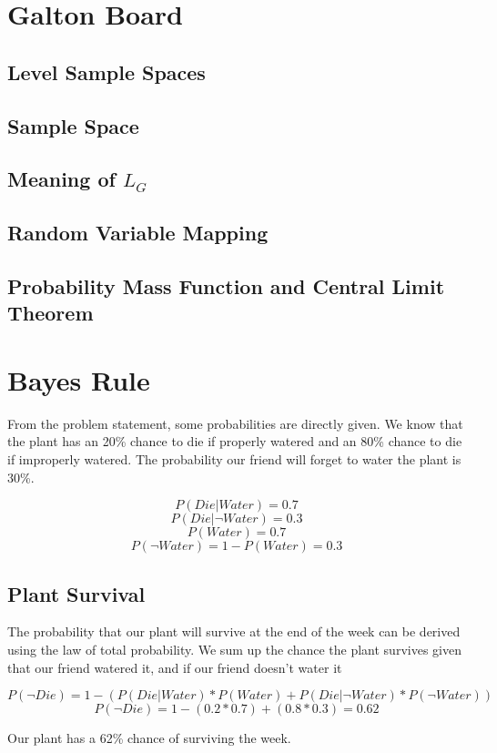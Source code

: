 \documentclass{article}
\begin{document}
\section{Galton Board}

\subsection{Level Sample Spaces}
\subsection{Sample Space}
\subsection{Meaning of $L_G$}
\subsection{Random Variable Mapping}
\subsection{Probability Mass Function and Central Limit Theorem}

\newpage
\section{Bayes Rule}

From the problem statement, some probabilities are directly given. We know that the plant has an 20\% chance to die if properly watered and an 80\% chance to die if improperly watered. The probability our friend will forget to water the plant is 30\%.

\[P(Die | Water) = 0.7\]
\[P(Die | \neg Water) = 0.3\]
\[P(Water) = 0.7\]
\[P(\neg Water) = 1 - P(Water) = 0.3\]

\subsection{Plant Survival}
The probability that our plant will survive at the end of the week can be derived using the law of total probability. We sum up the chance the plant survives given that our friend watered it, and if our friend doesn't water it

\[P(\neg Die) = 1 - ( P(Die | Water) * P(Water) + P(Die | \neg Water) * P(\neg Water) ) \]
\[P(\neg Die) = 1 - (0.2*0.7) + (0.8*0.3) = 0.62 \]

\noindent
Our plant has a 62\% chance of surviving the week.
\end{document}
